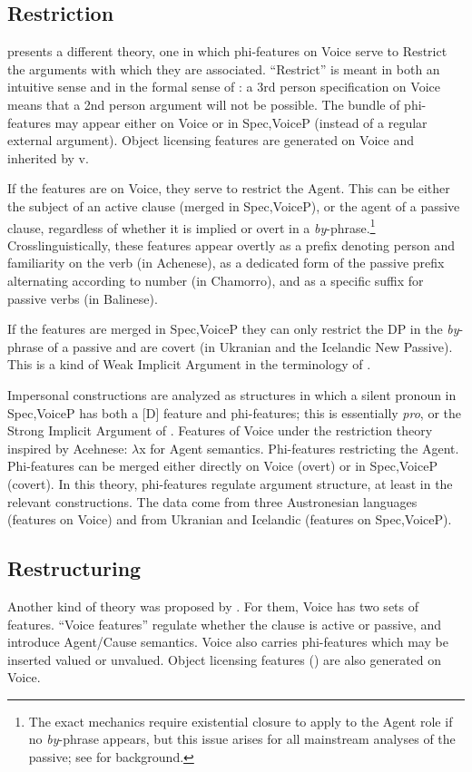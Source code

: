 	\subsection{Restriction}
\cite{legate12lang,legate14} presents a different theory, one in which phi-features on Voice serve to Restrict the arguments with which they are associated. ``Restrict'' is meant in both an intuitive sense and in the formal sense of \cite{chungladusaw04}: a 3rd person specification on Voice means that a 2nd person argument will not be possible. The bundle of phi-features may appear either on Voice or in Spec,VoiceP (instead of a regular external argument). Object licensing features are generated on Voice and inherited by v.

If the features are on Voice, they serve to restrict the Agent. This can be either the subject of an active clause (merged in Spec,VoiceP), or the agent of a passive clause, regardless of whether it is implied or overt in a \emph{by}-phrase.\footnote{The exact mechanics require existential closure to apply to the Agent role if no \emph{by}-phrase appears, but this issue arises for all mainstream analyses of the passive; see \cite{williams15} for background.} Crosslinguistically, these features appear overtly as a prefix denoting person and familiarity on the verb (in Achenese), as a dedicated form of the passive prefix alternating according to number (in Chamorro), and as a specific suffix for  passive verbs (in Balinese).

If the features are merged in Spec,VoiceP they can only restrict the DP in the \emph{by}-phrase of a passive and are covert (in Ukranian and the Icelandic New Passive). This is a kind of Weak Implicit Argument in the terminology of \cite{landau10}.

Impersonal constructions are analyzed as structures in which a silent pronoun in Spec,VoiceP has both a [D] feature and phi-features; this is essentially \textit{pro}, or the Strong Implicit Argument of \cite{landau10}.
\pex Features of Voice under the restriction theory inspired by Acehnese:
	\a $\lambda$x for Agent semantics.
	\a Phi-features restricting the Agent.
	\a Phi-features can be merged either directly on Voice (overt) or in Spec,VoiceP (covert).
\xe
In this theory, phi-features regulate argument structure, at least in the relevant constructions. The data come from three Austronesian languages (features on Voice) and from Ukranian and Icelandic (features on Spec,VoiceP).

	\subsection{Restructuring}
Another kind of theory was proposed by \cite{wurmbrandshimamura17}. For them, Voice has two sets of features. ``Voice features'' regulate whether the clause is active or passive, and introduce Agent/Cause semantics. Voice also carries phi-features which may be inserted valued or unvalued. Object licensing features () are also generated on Voice.


